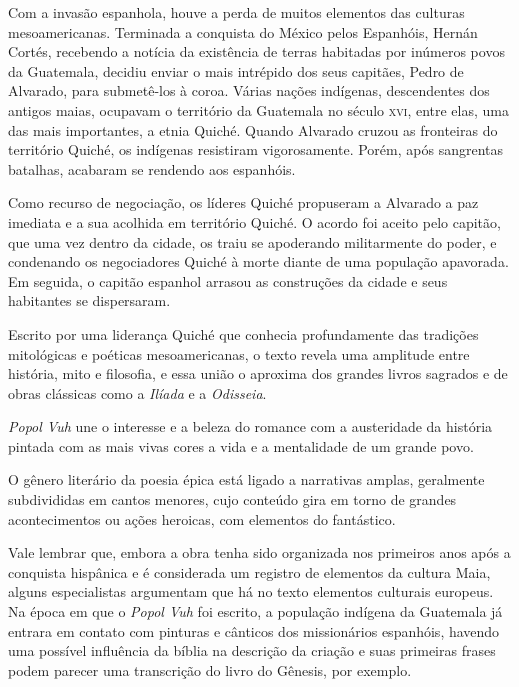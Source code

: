 \documentclass[12pt]{extarticle}
\begin{document}
Com a invasão espanhola, houve a perda de muitos elementos das culturas mesoamericanas. Terminada a conquista do México pelos Espanhóis, Hernán Cortés, recebendo a notícia da existência de terras habitadas por inúmeros povos da Guatemala, decidiu enviar o mais intrépido dos seus capitães, Pedro de Alvarado, para submetê-los à coroa.
Várias nações indígenas, descendentes dos antigos maias, ocupavam o território da Guatemala no século \textsc{xvi}, entre elas, uma das mais importantes, a etnia Quiché. Quando Alvarado cruzou as fronteiras do território Quiché, os indígenas resistiram vigorosamente. Porém, após sangrentas batalhas, acabaram se rendendo aos espanhóis.

Como recurso de negociação, os líderes Quiché propuseram a Alvarado a paz imediata e a sua acolhida em território Quiché. O acordo foi aceito pelo capitão, que uma vez dentro da cidade, os traiu se apoderando militarmente do poder, e condenando os negociadores Quiché à morte diante de uma população apavorada.
Em seguida, o capitão espanhol arrasou as construções da cidade e seus habitantes se dispersaram.





Escrito por uma liderança Quiché que conhecia profundamente das tradições mitológicas e poéticas mesoamericanas, o texto revela uma amplitude entre história, mito e filosofia, e essa união o aproxima dos grandes livros sagrados e de obras clássicas como a \emph{Ilíada} e a \emph{Odisseia}.

\textit{Popol Vuh} une o interesse e a beleza do romance com a austeridade da história pintada com as mais vivas cores a vida e a mentalidade de um grande povo.

O gênero literário da poesia épica está ligado a narrativas amplas, geralmente subdivididas em cantos menores, cujo conteúdo gira em torno de grandes acontecimentos ou ações heroicas, com elementos do fantástico.

Vale lembrar que, embora a obra tenha sido organizada nos primeiros anos após a conquista hispânica e é considerada um registro de elementos da cultura Maia, alguns especialistas argumentam que há no texto elementos culturais europeus. 
Na época em que o \textit{Popol Vuh} foi escrito, a população indígena da Guatemala já entrara em contato com pinturas e cânticos dos missionários espanhóis, havendo uma possível influência da bíblia na descrição da criação e suas primeiras frases podem parecer uma transcrição do livro do Gênesis, por exemplo. 
\end{document}
